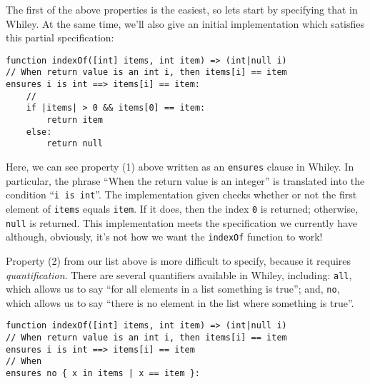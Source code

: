 The first of the above properties is the easiest, so lets start by
specifying that in Whiley.  At the same time, we'll also give an
initial implementation which satisfies this partial specification:

\begin{lstlisting}
function indexOf([int] items, int item) => (int|null i)
// When return value is an int i, then items[i] == item
ensures i is int ==> items[i] == item:
    //
    if |items| > 0 && items[0] == item:
        return item
    else:
        return null
\end{lstlisting}

Here, we can see property (1) above written as an \lstinline{ensures}
clause in Whiley.  In particular, the phrase ``When the return value
is an integer'' is translated into the condition ``\lstinline{i is int}''.  The implementation given checks whether or not the
first element of \lstinline{items} equals \lstinline{item}.  If it
does, then the index \lstinline{0} is returned; otherwise,
\lstinline{null} is returned.  This implementation meets the
specification we currently have although, obviously, it's not how we want the
\lstinline{indexOf} function to work!

Property (2) from our list above is more difficult to specify, because
it requires {\em quantification}.  There are several quantifiers
available in Whiley, including: \lstinline{all}, which allows us to
say ``for all elements in a list something is true''; and,
\lstinline{no}, which allows us to say ``there is no element in the list
where something is true''.

\begin{lstlisting}
function indexOf([int] items, int item) => (int|null i)
// When return value is an int i, then items[i] == item
ensures i is int ==> items[i] == item
// When
ensures no { x in items | x == item }:
\end{lstlisting}
